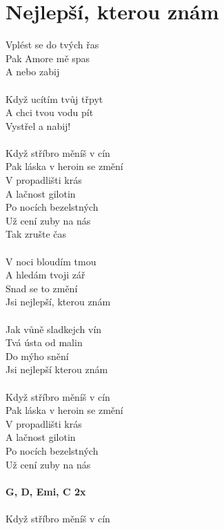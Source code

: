 \section{Nejlepší, kterou znám}
\begin{multicols}{2}
Vplést se do tvých řas\\
Pak Amore mě spas\\
A nebo zabij\\
\\
Když ucítím tvůj třpyt\\
A chci tvou vodu pít\\
Vystřel a nabij!\\
\\
Když stříbro měníš v cín\\
Pak láska v heroin se změní\\
V propadlišti krás\\
A lačnost gilotin\\
Po nocích bezelstných\\
Už cení zuby na nás\\
Tak zrušte čas\\
\\
V noci bloudím tmou\\
A hledám tvoji zář\\
Snad se to změní\\
Jsi nejlepší, kterou znám\\
\\
Jak vůně sladkejch vín\\
Tvá ústa od malin\\
Do mýho snění\\
Jsi nejlepší kterou znám\\
\columnbreak
\\
Když stříbro měníš v cín\\
Pak láska v heroin se změní\\
V propadlišti krás\\
A lačnost gilotin\\
Po nocích bezelstných\\
Už cení zuby na nás\\
\\
\footnotesize\textbf{G, D, Emi, C 2x}\\
\\
\normalsize
{}Když stříbro měníš v cín\\

\end{multicols}
